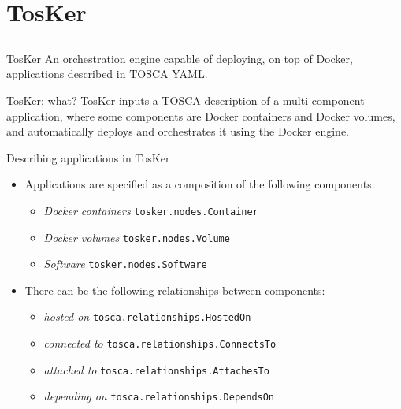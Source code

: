 \documentclass{beamer}
\begin{document}
\section{TosKer}\subsection*{}
  \begin{frame}{TosKer}
    An orchestration engine capable of deploying, on top of Docker, applications described in TOSCA YAML.
  \end{frame}

  \begin{frame}{TosKer: what?}
    TosKer inputs a TOSCA description of a multi-component application, where some components are Docker containers and Docker volumes, and automatically deploys and orchestrates it using the Docker engine.
  \end{frame}

  \begin{frame}{Describing applications in TosKer}
    \begin{itemize}
      \item Applications are specified as a composition of the following components:\begin{itemize}
          \item \small\emph{Docker containers} {\tiny\texttt{tosker.nodes.Container}}
          \item \small\emph{Docker volumes} {\tiny\texttt{tosker.nodes.Volume}}
          \item \small\emph{Software} {\tiny\texttt{tosker.nodes.Software}}
        \end{itemize}\pause
      \item There can be the following relationships between components:\begin{itemize}
          \item \small\emph{hosted on} {\tiny\texttt{tosca.relationships.HostedOn}}
          \item \small\emph{connected to} {\tiny\texttt{tosca.relationships.ConnectsTo}}
          \item \small\emph{attached to} {\tiny\texttt{tosca.relationships.AttachesTo}}
          \item \small\emph{depending on} {\tiny\texttt{tosca.relationships.DependsOn}}
        \end{itemize}
    \end{itemize}
  \end{frame}
\end{document}
